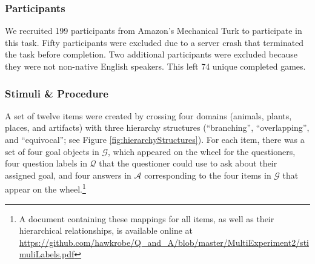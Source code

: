 \documentclass[12pt, floatsintext, man]{apa6}
\begin{document}
\subsubsection{Participants} We recruited 199 participants
from Amazon's Mechanical Turk to participate in this task. Fifty participants were excluded due to a server crash that terminated the task before completion. Two additional participants were excluded because they were not non-native English speakers. This left 74 unique completed games.


\subsubsection{Stimuli \& Procedure} A set of twelve items were created by crossing four domains (animals, plants, places, and artifacts) with three hierarchy structures (``branching'', ``overlapping'', and ``equivocal''; see Figure \ref{fig:hierarchyStructures}). For each item, there was a set of four goal objects in $\mathcal{G}$, which appeared on the wheel for the questioners, four question labels in $\mathcal{Q}$ that the questioner could use to ask about their assigned goal, and four answers in $\mathcal{A}$ corresponding to the four items in $\mathcal{G}$ that appear on the wheel.\footnote{A document containing these mappings for all items, as well as their hierarchical relationships, is available online at \url{https://github.com/hawkrobe/Q\_and\_A/blob/master/MultiExperiment2/stimuliLabels.pdf}} 
\end{document}
